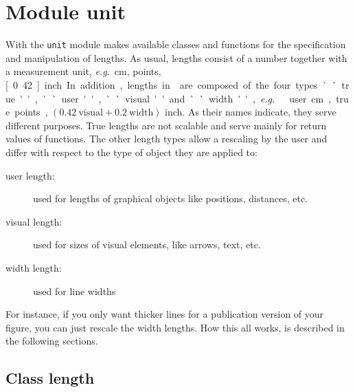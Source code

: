 \chapter{Module unit}
\label{unit}

With the \verb|unit| module \PyX{} makes available classes and
functions for the specification and manipulation of lengths. As usual,
lengths consist of a number together with a measurement unit,
\textit{e.g.}\ \unit[1]{cm}, \unit[50]{points}, \unit[0.42]{inch}.  In 
addition, lengths in \PyX{} are composed of the four types ``true'', 
``user'', ``visual'' and ``width'', \textit{e.g.}\ \unit[1]{user cm}, 
\unit[50]{true points}, $(0.42\ \mathrm{visual} + 0.2\ \mathrm{width})$ inch.  
As their names indicate, they serve different purposes. True lengths are not
scalable and serve mainly for return values of \PyX{} functions.  The
other length types allow a rescaling by the user and differ with
respect to the type of object they are applied to:

\begin{description}
\item[user length:] used for lengths of graphical objects like
  positions, distances, etc.
\item[visual length:] used for sizes of visual elements, like arrows,
  text, etc.
\item[width length:] used for line widths
\end{description}

For instance, if you only want thicker lines for a publication
version of your figure, you can just rescale the width lengths. How
this all works, is described in the following sections.

\section{Class length}

